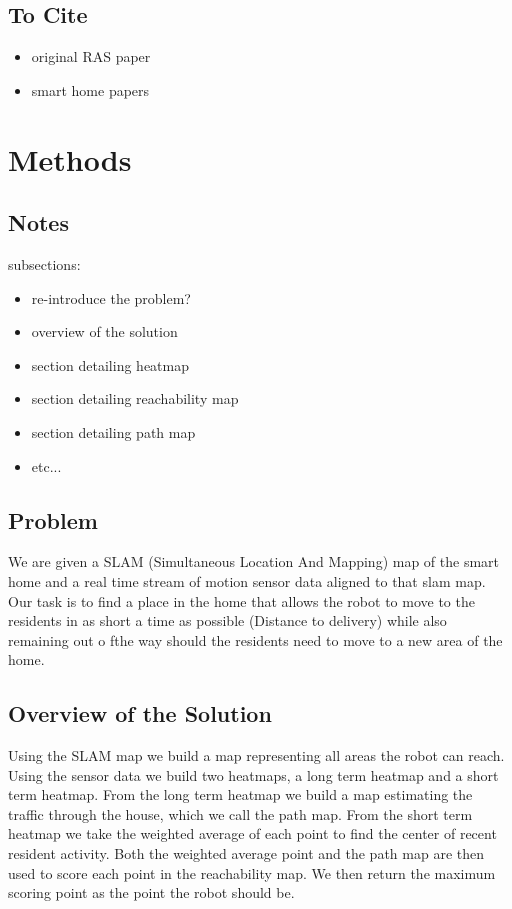 \documentclass[11pt, conference, a4paper]{IEEEtran}
\begin{document}
\subsection{To Cite}
\begin{itemize}
    \item original RAS paper
    \item smart home papers
\end{itemize}

\section{Methods}

\subsection{Notes}
subsections:
\begin{itemize}
    \item re-introduce the problem?
    \item overview of the solution
    \item section detailing heatmap
    \item section detailing reachability map
    \item section detailing path map
    \item etc...
\end{itemize}

\subsection{Problem}
We are given a SLAM (Simultaneous Location And Mapping) map of the smart home
and a real time stream of motion sensor data aligned to that slam map.
Our task is to find a place in the home that allows the robot to move to the
residents in as short a time as possible (Distance to delivery) while also
remaining out o fthe way should the residents need to move to a new area of
the home.

\subsection{Overview of the Solution}
Using the SLAM map we build a map representing all areas the robot can reach.
Using the sensor data we build two heatmaps, a long term heatmap and a short
term heatmap. From the long term heatmap we build a map estimating the traffic
through the house, which we call the path map. From the short term heatmap we 
take the weighted average of each point to find the center of recent resident 
activity. Both the weighted average point and the path map are then used to
score each point in the reachability map. We then return the maximum scoring
point as the point the robot should be.
\end{document}
